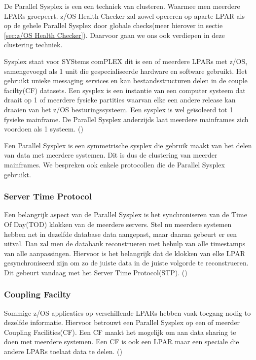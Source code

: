 De Parallel Sysplex is een een techniek van clusteren. Waarmee men meerdere LPARs groepeert.  z/OS Health Checker zal zowel opereren op aparte LPAR als op de gehele Parallel Sysplex door globale checks(meer hierover in sectie \ref{sec:z/OS Health Checker}). Daarvoor gaan we ons ook verdiepen in deze clustering techniek.

Sysplex staat voor SYStems comPLEX dit is een of meerdere LPARs met z/OS, samengevoegd als 1 unit die gespecialiseerde hardware en software gebruikt. Het gebruikt unieke messaging services en kan bestandsstructuren delen in de couple facilty(CF) datasets. Een sysplex is een instantie van een computer systeem dat draait op 1 of meerdere fysieke partities waarvan elke een andere release kan draaien van het z/OS besturingssysteem. Een sysplex is wel geïsoleerd tot 1 fysieke mainframe. De Parallel Sysplex anderzijds laat meerdere mainframes zich voordoen als 1 systeem. (\cite{Ebbers2011}) 

Een Parallel Sysplex is een symmetrische sysplex die gebruik maakt van het delen van data met meerdere systemen. Dit is dus de clustering van meerder mainframes. We bespreken ook enkele protocollen die de Parallel Sysplex gebruikt. 

\subsubsection{Server Time Protocol}
\label{subsubsec:Server Time Protocol}

Een belangrijk aspect van de Parallel Sysplex is het synchroniseren van de Time Of Day(TOD) klokken van de meerdere servers. Stel nu meerdere systemen hebben net in dezelfde database data aangepast, maar daarna gebeurt er een uitval. Dan zal men de databank reconstrueren met behulp van alle timestamps van alle aanpassingen. Hiervoor is het belangrijk dat de klokken van elke LPAR gesynchroniseerd zijn om zo de juiste data in de juiste volgorde te reconstrueren. Dit gebeurt vandaag met het Server Time Protocol(STP). (\cite{Ebbers2011})

\subsubsection{Coupling Facilty}
\label{subsubsec:Coupling Facility}

Sommige z/OS applicaties op verschillende LPARs hebben vaak toegang nodig to dezelfde informatie. Hiervoor betrouwt een Parallel Sysplex op een of meerder Coupling Facilities(CF). Een CF maakt het mogelijk om aan data sharing te doen met meerdere systemen. Een CF is ook een LPAR maar een speciale die andere LPARs toelaat data te delen. (\cite{Ebbers2011})


